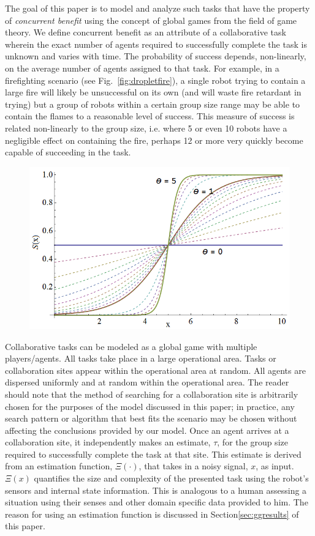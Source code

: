 \documentclass[conference]{ieeeconf}
\begin{document}
The goal of this paper is to model and analyze such tasks that have the property of \emph{concurrent benefit} using the concept of global games from the field of game theory. We define concurrent benefit as an attribute of a collaborative task wherein the exact number of agents required to successfully complete the task is unknown and varies with time. The probability of success depends, non-linearly, on the average number of agents assigned to that task. For example, in a firefighting scenario (see Fig.~\ref{fig:dropletfire}), a single robot trying to contain a large fire will likely be unsuccessful on its own (and will waste fire retardant in trying) but a group of robots within a certain group size range may be able to contain the flames to a reasonable level of success. This measure of success is related non-linearly to the group size, i.e. where 5 or even 10 robots have a negligible effect on containing the fire, perhaps 12 or more very quickly become capable of succeeding in the task.

\begin{figure}[!ht]
\centering\includegraphics[width=\columnwidth]{../figures/sigmoid1.png}
\centering\caption{}\label{fig:sigmoid}
\end{figure}

Collaborative tasks can be modeled as a global game with multiple players/agents. All tasks take place in a large operational area. Tasks or collaboration sites appear within the operational area at random. All agents are dispersed uniformly and at random within the operational area. The reader should note that the method of searching for a collaboration site is arbitrarily chosen for the purposes of the model discussed in this paper; in practice, any search pattern or algorithm that best fits the scenario may be chosen without affecting the conclusions provided by our model. Once an agent arrives at a collaboration site, it independently makes an estimate, $\tau$, for the group size required to successfully complete the task at that site. This estimate is derived from an estimation function, $\Xi(\cdot)$, that takes in a noisy signal, $x$, as input. $\Xi(x)$ quantifies the size and complexity of the presented task using the robot's sensors and internal state information. This is analogous to a human assessing a situation using their senses and other domain specific data provided to him. The reason for using an estimation function is discussed in Section\ref{sec:ggresults} of this paper.
\end{document}
